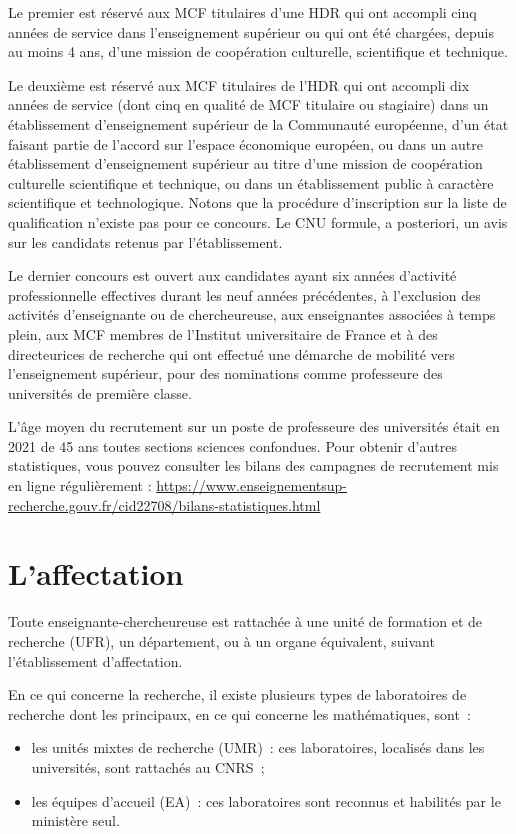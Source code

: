 Le premier est r\'eserv\'e
aux MCF titulaires d'une HDR qui ont accompli cinq ann\'ees de service dans l'enseignement sup\'erieur ou qui ont \'et\'e charg\'e\mp e\mp s, 
depuis au moins 4 ans, d'une mission de coop\'eration culturelle,
scientifique et technique.

Le deuxi\`eme est r\'eserv\'e aux MCF titulaires de l'HDR qui ont accompli dix ann\'ees de service
(dont cinq en qualit\'e de MCF titulaire ou stagiaire) dans un \'etablissement d'enseignement sup\'erieur
de la Communaut\'e europ\'eenne, d'un \'etat faisant partie de l'accord sur l'espace \'economique
europ\'een,
ou dans un autre \'etablissement d'enseignement sup\'erieur au titre d'une mission de coop\'eration culturelle scientifique et technique, 
ou dans un \'etablissement public \`a caract\`ere scientifique et technologique.
Notons que la proc\'edure d'inscription sur la liste de qualification n'existe pas pour ce concours.
Le CNU formule, a posteriori, un avis sur les candidats retenus par l'\'etablissement.

Le dernier concours est ouvert
aux candidat\mp e\mp s ayant six ann\'ees d'activit\'e professionnelle effectives
durant les neuf ann\'ees pr\'ec\'edentes,
\`a l'exclusion des activit\'es d'enseignant\mp e ou de chercheur\mp euse,
aux enseignant\mp e\mp s associ\'e\mp e\mp s \`a temps plein,
aux MCF membres de l'Institut universitaire de France
et \`a des directeur\mp ice\mp s de recherche qui ont effectu\'e une d\'emarche de mobilit\'e
vers l'enseignement sup\'erieur, pour des nominations comme professeur\mp e des universit\'es de premi\`ere classe.

L'\^age moyen du recrutement sur un poste de  professeur\mp e des
universit\'es \'etait en 2021 de 45 ans toutes sections sciences confondues. Pour obtenir d'autres statistiques, vous pouvez consulter les bilans des campagnes de recrutement mis en ligne r\'e\-gu\-li\`erement :
{\url{https://www.enseignementsup-recherche.gouv.fr/cid22708/bilans-statistiques.html}}

\section{L'affectation}

Tout\mp e enseignant\mp e-chercheur\mp euse est rattach\'e\mp e \`a une unit\'e de formation
et de recherche (UFR), un d\'epar\-te\-ment, ou \`a un organe
\'equivalent, suivant l'\'etablissement d'affectation.

En ce qui concerne la recherche, il existe plusieurs types de
laboratoires de recherche dont les principaux, en ce qui concerne
les math\'ematiques, sont~:
\begin{itemize}
	\item les unit\'es mixtes de recherche (UMR)~: ces laboratoires,
		localis\'es dans les universit\'es, sont rattach\'es au CNRS~;
	\item les \'equipes d'accueil (EA)~: ces laboratoires sont
		reconnus et habilit\'es par le minist\`ere seul.
\end{itemize}

